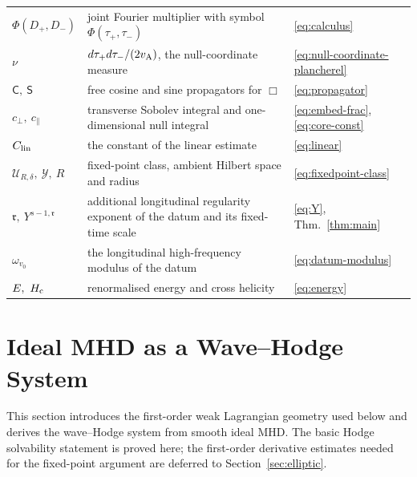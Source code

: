 \documentclass[11pt,reqno]{amsart}
\theoremstyle{plain}
\theoremstyle{definition}
\theoremstyle{remark}
\numberwithin{equation}{section}
\newcommand{\rpar}{\mathfrak r}
\newcommand{\Cprop}{\mathsf C}
\newcommand{\Sprop}{\mathsf S}
\begin{document}
\begin{table}[htbp]
\begin{tabular}{@{}>{\raggedright\arraybackslash}p{}>{\raggedright\arraybackslash}p{}>{\raggedright\arraybackslash}p{}@{}}
$\Phi(D_{+},D_{-})$ & joint Fourier multiplier with symbol $\Phi(\tau_+,\tau_-)$ & \eqref{eq:calculus} \\
$\nu$ & $d\tau_+ d\tau_-/(2v_{\rm A})$, the null-coordinate measure & \eqref{eq:null-coordinate-plancherel} \\
$\Cprop,\ \Sprop$ & free cosine and sine propagators for $\Box$ & \eqref{eq:propagator} \\
$c_\perp,\ c_\parallel$ & transverse Sobolev integral and one-dimensional null integral & \eqref{eq:embed-frac}, \eqref{eq:core-const} \\
$C_{\rm lin}$ & the constant of the linear estimate & \eqref{eq:linear} \\
$\mathcal U_{R,\delta},\ \mathcal Y,\ R$ & fixed-point class, ambient Hilbert space and radius & \eqref{eq:fixedpoint-class} \\
$\rpar,\ Y^{s-1,\rpar}$ & additional longitudinal regularity exponent of the datum and its fixed-time scale & \eqref{eq:Y}, Thm.~\ref{thm:main} \\
$\omega_{v_0}$ & the longitudinal high-frequency modulus of the datum & \eqref{eq:datum-modulus} \\
$E,\ H_{\rm c}$ & renormalised energy and cross helicity & \eqref{eq:energy} \\ \hline
\end{tabular}
\end{table}
\endgroup

\section{Ideal MHD as a Wave--Hodge System}
\label{sec:wave-hodge}

This section introduces the first-order weak Lagrangian geometry used below
and derives the wave--Hodge system from smooth ideal MHD.  The basic Hodge
solvability statement is proved here; the first-order derivative estimates needed for
the fixed-point argument are deferred to Section~\ref{sec:elliptic}.\\
\end{document}
